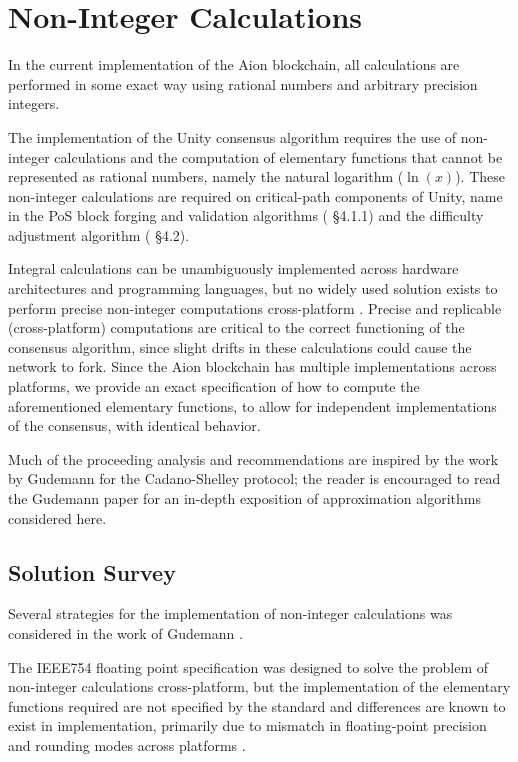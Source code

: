 \section{Non-Integer Calculations}
In the current implementation of the Aion blockchain, all calculations are performed in some exact way using rational numbers and arbitrary precision integers.

The implementation of the Unity consensus algorithm requires the use of non-integer calculations and the computation of elementary functions that cannot be represented as rational numbers, namely the natural logarithm ($\ln(x)$). These non-integer calculations are required on critical-path components of Unity, name in the PoS block forging and validation algorithms (\cite{WZS19} \S4.1.1) and the difficulty adjustment algorithm (\cite{WZS19} \S4.2).

Integral calculations can be unambiguously implemented across hardware architectures and programming languages, but no widely used solution exists to perform precise non-integer computations cross-platform \cite{Izm19}. Precise and replicable (cross-platform) computations are critical to the correct functioning of the consensus algorithm, since slight drifts in these calculations could cause the network to fork. Since the Aion blockchain has multiple implementations  across platforms, we provide an exact specification of how to compute the aforementioned elementary functions, to allow for independent implementations of the consensus, with identical behavior.

Much of the proceeding analysis and recommendations are inspired by the work by Gudemann \cite{Gud19} for the Cadano-Shelley protocol; the reader is encouraged to read the Gudemann paper for an in-depth exposition of approximation algorithms considered here.

\subsection{Solution Survey}
Several strategies for the implementation of non-integer calculations was considered in the work of Gudemann \cite{Gud19}. 

The IEEE754 floating point specification was designed to solve the problem of non-integer calculations cross-platform, but the implementation of the elementary functions required are not specified by the standard and differences are known to exist in implementation, primarily due to mismatch in floating-point precision and rounding modes across platforms \cite{Obi06}. 

